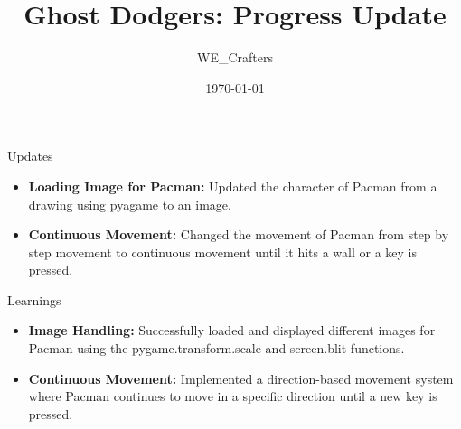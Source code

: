 \documentclass{beamer}
\title{Ghost Dodgers: Progress Update}
\author{WE\_Crafters}
\date{\today}
\begin{document}
\begin{frame}
  \titlepage
\end{frame}

\begin{frame}{Updates}
	\begin{itemize}
		\item \textbf{Loading Image for Pacman:} Updated the character of Pacman from a drawing using pyagame to an image.
		\item \textbf{Continuous Movement:} Changed the movement of Pacman from step by step movement to continuous movement until it hits a wall or a key is pressed.
	\end{itemize}
\end{frame}

\begin{frame}{Learnings}
	\begin{itemize}
		\item \textbf{Image Handling:} Successfully loaded and displayed different images for Pacman using the pygame.transform.scale and screen.blit functions.
		\item \textbf{Continuous Movement:} Implemented a direction-based movement system where Pacman continues to move in a specific direction until a new key is pressed.
	\end{itemize}
\end{frame}
\end{document}
